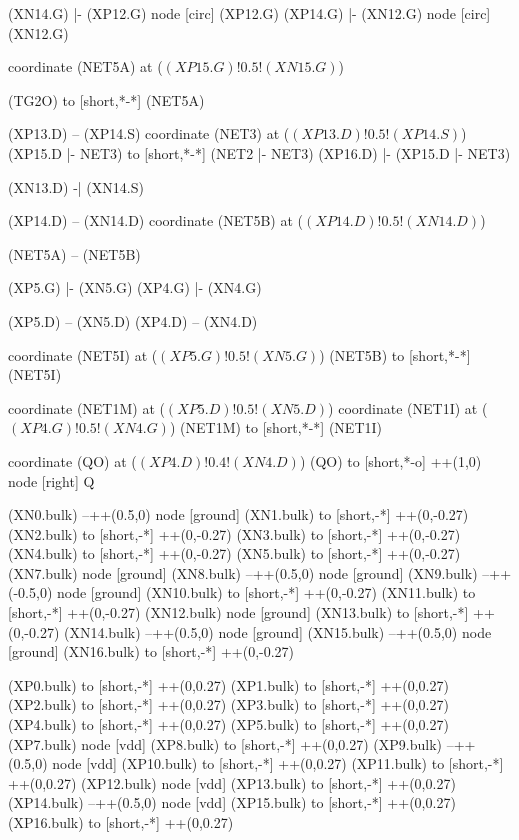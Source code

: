 \begin{circuitikz}[american]
	(XN14.G) |- (XP12.G)
	node [circ] (XP12.G) {}
	(XP14.G) |- (XN12.G)
	node [circ] (XN12.G) {}
	
	coordinate (NET5A) at ($(XP15.G)!0.5!(XN15.G)$)
	
	(TG2O) to [short,*-*] (NET5A)
	
	(XP13.D) -- (XP14.S)
	coordinate (NET3) at ($(XP13.D)!0.5!(XP14.S)$)
	(XP15.D |- NET3) to [short,*-*] (NET2 |- NET3)
	(XP16.D) |- (XP15.D |- NET3)
	
	(XN13.D) -| (XN14.S)
	
	(XP14.D) -- (XN14.D)
	coordinate (NET5B) at ($(XP14.D)!0.5!(XN14.D)$) 
	
	
	(NET5A) -- (NET5B)
	
	(XP5.G) |- (XN5.G) 
	(XP4.G) |- (XN4.G)
	
	(XP5.D) -- (XN5.D)
	(XP4.D) -- (XN4.D) 
	
	coordinate (NET5I) at ($(XP5.G)!0.5!(XN5.G)$)
	(NET5B) to [short,*-*] (NET5I)
	
	coordinate (NET1M) at ($(XP5.D)!0.5!(XN5.D)$) 	
	coordinate (NET1I) at ($(XP4.G)!0.5!(XN4.G)$) 	
	(NET1M) to [short,*-*] (NET1I)
	
	coordinate (QO) at ($(XP4.D)!0.4!(XN4.D)$)
	(QO) to [short,*-o] ++(1,0) node [right] {Q}
	
	(XN0.bulk) --++(0.5,0) node [ground] {}
	(XN1.bulk) to [short,-*] ++(0,-0.27)		
	(XN2.bulk) to [short,-*] ++(0,-0.27)
	(XN3.bulk) to [short,-*] ++(0,-0.27)
	(XN4.bulk) to [short,-*] ++(0,-0.27)
	(XN5.bulk) to [short,-*] ++(0,-0.27)
	(XN7.bulk) node [ground] {}
	(XN8.bulk) --++(0.5,0) node [ground] {}
	(XN9.bulk) --++(-0.5,0) node [ground] {}
	(XN10.bulk) to [short,-*] ++(0,-0.27)
	(XN11.bulk) to [short,-*] ++(0,-0.27)
	(XN12.bulk) node [ground] {}
	(XN13.bulk) to [short,-*] ++(0,-0.27)
	(XN14.bulk) --++(0.5,0) node [ground] {}
	(XN15.bulk) --++(0.5,0) node [ground] {}
	(XN16.bulk) to [short,-*] ++(0,-0.27)
	
	(XP0.bulk) to [short,-*] ++(0,0.27)
	(XP1.bulk) to [short,-*] ++(0,0.27)	
	(XP2.bulk) to [short,-*] ++(0,0.27)
	(XP3.bulk) to [short,-*] ++(0,0.27)	
	(XP4.bulk) to [short,-*] ++(0,0.27)
	(XP5.bulk) to [short,-*] ++(0,0.27)
	(XP7.bulk) node [vdd] {}	
	(XP8.bulk) to [short,-*] ++(0,0.27)
	(XP9.bulk) --++(0.5,0) node [vdd] {}
	(XP10.bulk) to [short,-*] ++(0,0.27)
	(XP11.bulk) to [short,-*] ++(0,0.27)
	(XP12.bulk) node [vdd] {}
	(XP13.bulk) to [short,-*] ++(0,0.27)
	(XP14.bulk) --++(0.5,0) node [vdd] {}
	(XP15.bulk) to [short,-*] ++(0,0.27)
	(XP16.bulk) to [short,-*] ++(0,0.27)


\end{circuitikz}
